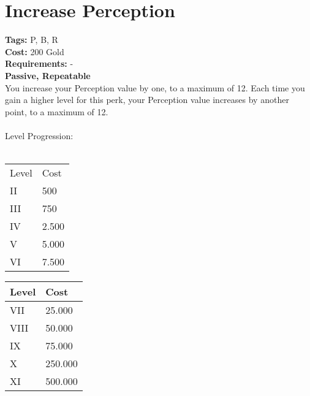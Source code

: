 \section{Increase Perception}\label{sec:increaseperception}
\textbf{Tags:} P, B, R\\
\textbf{Cost:} 200 Gold\\
\textbf{Requirements:} -\\
\textbf{Passive, Repeatable}\\
You increase your Perception value by one, to a maximum of 12.
Each time you gain a higher level for this perk, your Perception value increases by another point, to a maximum of 12.\\
\\
Level Progression:\\
\\
\begin{minipage}{0.5\textwidth}
    \begin{tabular}{l | l}
        Level & Cost\\
        II & 500\\
        III & 750\\
        IV & 2.500\\
        V & 5.000\\
        VI & 7.500\\
    \end{tabular}
\end{minipage}
\begin{minipage}{0.5\textwidth}
    \begin{tabular}{l | l}
        Level & Cost\\ \hline
        VII & 25.000\\
        VIII & 50.000\\
        IX & 75.000\\
        X & 250.000\\
        XI & 500.000\\
    \end{tabular}
\end{minipage}